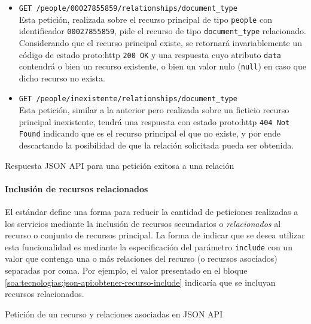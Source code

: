 \begin{itemize}
  \item \verb|GET /people/00027855859/relationships/document_type|\\
    Esta petición, realizada sobre el recurso principal de tipo \texttt{people} con identificador \texttt{00027855859}, pide el recurso de tipo \verb|document_type| relacionado. Considerando que el recurso principal existe, se retornará invariablemente un código de estado \gls{proto:http} \texttt{200 OK} y una respuesta cuyo atributo \texttt{data} contendrá o bien un recurso existente, o bien un valor nulo (\texttt{null}) en caso que dicho recurso no exista.
  \item \verb|GET /people/inexistente/relationships/document_type|\\
    Esta petición, similar a la anterior pero realizada sobre un ficticio recurso principal inexistente, tendrá una respuesta con estado \gls{proto:http} \texttt{404 Not Found} indicando que es el recurso principal el que no existe, y por ende descartando la posibilidad de que la relación solicitada pueda ser obtenida.
\end{itemize}

\begin{listing}
  \caption{Respuesta JSON API para una petición exitosa a una relación}
  \label{soa:tecnologias:json-api:respuesta-200-obtener-relacion}
\end{listing}

\paragraph{Inclusión de recursos relacionados}

El estándar define una forma para reducir la cantidad de peticiones realizadas a los servicios mediante la inclusión de recursos secundarios o \textit{relacionados} al recurso o conjunto de recursos principal. La forma de indicar que se desea utilizar esta funcionalidad es mediante la especificación del parámetro \texttt{include} con un valor que contenga una o más relaciones del recurso (o recursos asociados) separadas por coma. Por ejemplo, el valor presentado en el bloque \autoref{soa:tecnologias:json-api:obtener-recurso-include} indicaría que se incluyan recursos relacionados.

\begin{listing}
  \caption{Petición de un recurso y relaciones asociadas en JSON API}
  \label{soa:tecnologias:json-api:obtener-recurso-include}
\end{listing}

